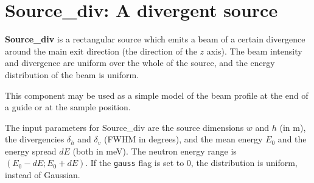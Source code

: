 \section{Source\_div: A divergent source}
\label{source-div}


{\bf Source\_div} is a rectangular source which emits a
beam of a certain divergence around the main exit direction
(the direction of the $z$ axis).
The beam intensity and divergence are uniform over
the whole of the source, and the energy distribution
of the beam is uniform.

This component may be used as a simple model of the
beam profile at the end of a guide or at the sample
position.

The input parameters for Source\_div are the source dimensions
$w$ and $h$ (in m), the divergencies $\delta_h$ and $\delta_v$ (FWHM in degrees),
and the mean energy $E_0$ and the energy spread $dE$ (both in meV).
The neutron energy range is $(E_0-dE; E_0+dE)$.
If the \verb+gauss+ flag is set to 0, the distribution is uniform, instead of Gaussian.

